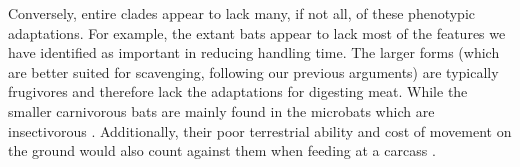 \documentclass[a4paper,12pt]{article}
\begin{document}

Conversely, entire clades appear to lack many, if not all, of these phenotypic adaptations. %
For example, the extant bats appear to lack most of the features we have identified as important in reducing handling time.
The larger forms (which are better suited for scavenging, following our previous arguments) are typically frugivores and therefore lack the adaptations for digesting meat.
While the smaller carnivorous bats are mainly found in the microbats which are insectivorous \citep{aguirre2003implications}.
Additionally, their poor terrestrial ability and cost of movement on the ground would also count against them when feeding at a carcass \citep{riskin2006terrestrial,voigt2012terrestrial}.

\end{document}

